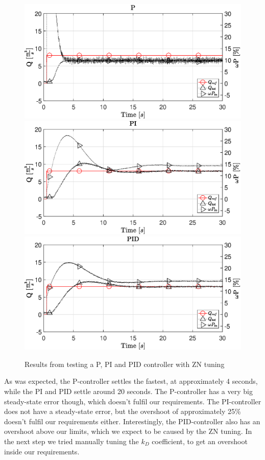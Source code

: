 \begin{figure}[H]
    \centering
    \includegraphics[width=\textwidth]{figures/07controllerDesign/Ptest.eps}
    \includegraphics[width=\textwidth]{figures/07controllerDesign/PItest.eps}
    \includegraphics[width=\textwidth]{figures/07controllerDesign/PIDtest.eps}
    \caption{Results from testing a P, PI and PID controller with ZN tuning}
	\label{fig:PIDtest}
\end{figure}

As was expected, the P-controller settles the fastest,
at approximately 4 seconds,
while the PI and PID settle around 20 seconds.
The P-controller has a very big steady-state error though,
which doesn't fulfil our requirements.
The PI-controller does not have a steady-state error,
but the overshoot of approximately 25\% doesn't fulfil our requirements either.
Interestingly, the PID-controller also has an overshoot above our limits,
which we expect to be caused by the ZN tuning.
In the next step we tried manually tuning the $k_D$ coefficient,
to get an overshoot inside our requirements.


